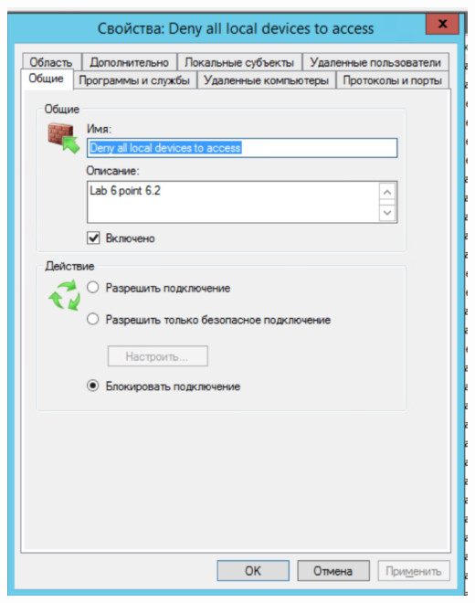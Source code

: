 \documentclass[a4paper,14pt]{extarticle}
\begin{document}
    \begin{center}
        \includegraphics[scale=0.7]{6.2.1.png}
    \end{center}
\end{document}
